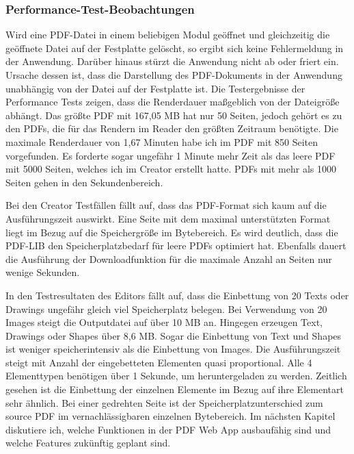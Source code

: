 \subsubsection{Performance-Test-Beobachtungen}
Wird eine PDF-Datei in einem beliebigen Modul geöffnet und gleichzeitig die geöffnete Datei auf der Festplatte gelöscht, so ergibt sich keine Fehlermeldung in der Anwendung. Darüber hinaus stürzt die Anwendung nicht ab oder friert ein. Ursache dessen ist, dass die Darstellung des PDF-Dokuments in der Anwendung unabhängig von der Datei auf der Festplatte ist. Die Testergebnisse der Performance Tests zeigen, dass die Renderdauer maßgeblich von der Dateigröße abhängt. Das größte PDF mit 167,05 MB hat nur 50 Seiten, jedoch gehört es zu den PDFs, die für das Rendern im Reader den größten Zeitraum benötigte. Die maximale Renderdauer von 1,67 Minuten habe ich im PDF mit 850 Seiten vorgefunden. Es forderte sogar ungefähr 1 Minute mehr Zeit als das leere PDF mit 5000 Seiten, welches ich im Creator erstellt hatte. PDFs mit mehr als 1000 Seiten gehen in den Sekundenbereich.
\par 
Bei den Creator Testfällen fällt auf, dass das PDF-Format sich kaum auf die Ausführungszeit auswirkt. Eine Seite mit dem maximal unterstützten Format liegt im Bezug auf die Speichergröße im Bytebereich. Es wird deutlich, dass die PDF-LIB den Speicherplatzbedarf für leere PDFs optimiert hat. Ebenfalls dauert die Ausführung der Downloadfunktion für die maximale Anzahl an Seiten nur wenige Sekunden. 
\par
In den Testresultaten des Editors fällt auf, dass die Einbettung von 20 Texts oder Drawings ungefähr gleich viel Speicherplatz belegen. Bei Verwendung von 20 Images steigt die Outputdatei auf über 10 MB an. Hingegen erzeugen Text, Drawings oder Shapes über 8,6 MB. Sogar die Einbettung von Text und Shapes ist weniger speicherintensiv als die Einbettung von Images. Die Ausführungszeit steigt mit Anzahl der eingebetteten Elementen quasi proportional. Alle 4 Elementtypen benötigen über 1 Sekunde, um heruntergeladen zu werden. Zeitlich gesehen ist die Einbettung der einzelnen Elemente im Bezug auf ihre Elementart sehr ähnlich. Bei einer gedrehten Seite ist der Speicherplatzunterschied zum source PDF im vernachlässigbaren einzelnen Bytebereich. Im nächsten Kapitel diskutiere ich, welche Funktionen in der PDF Web App ausbaufähig sind und welche Features zukünftig geplant sind.